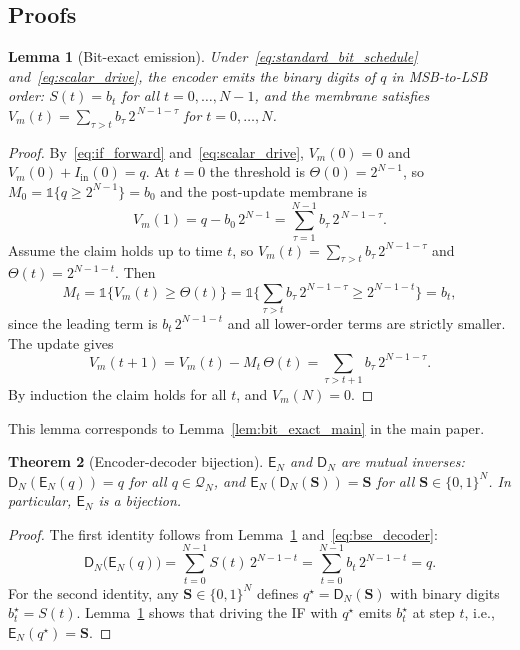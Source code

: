 \documentclass{article}
\theoremstyle{plain}
\newtheorem{theorem}{Theorem}[section]
\newtheorem{lemma}[theorem]{Lemma}
\theoremstyle{definition}
\theoremstyle{remark}
\begin{document}
\subsection{Proofs}
\label{app:bse_proofs}

\begin{lemma}[Bit-exact emission]
\label{lem:bit_exact}
Under~\eqref{eq:standard_bit_schedule} and~\eqref{eq:scalar_drive}, the encoder
emits the binary digits of $q$ in MSB-to-LSB order: $S(t) = b_t$ for all
$t = 0, \dots, N-1$, and the membrane satisfies
$V_m(t) = \sum_{\tau > t} b_\tau\,2^{\,N-1-\tau}$ for $t = 0, \dots, N$.
\end{lemma}

\begin{proof}
By~\eqref{eq:if_forward} and~\eqref{eq:scalar_drive}, $V_m(0) = 0$ and
$V_m(0) + I_{\mathrm{in}}(0) = q$. At $t = 0$ the threshold is
$\Theta(0) = 2^{N-1}$, so $M_0 = \mathbb{1}\{q \ge 2^{N-1}\} = b_0$ and the
post-update membrane is
\[
V_m(1) = q - b_0\,2^{N-1} = \sum_{\tau=1}^{N-1} b_\tau\,2^{\,N-1-\tau}.
\]
Assume the claim holds up to time $t$, so $V_m(t) = \sum_{\tau > t}
b_\tau\,2^{N-1-\tau}$ and $\Theta(t) = 2^{N-1-t}$. Then
\[
M_t
= \mathbb{1}\{V_m(t) \ge \Theta(t)\}
= \mathbb{1}\!\Big\{\sum_{\tau > t} b_\tau\,2^{N-1-\tau} \ge 2^{N-1-t}\Big\}
= b_t,
\]
since the leading term is $b_t\,2^{N-1-t}$ and all lower-order terms are strictly
smaller. The update gives
\[
V_m(t+1) = V_m(t) - M_t\,\Theta(t) = \sum_{\tau > t+1} b_\tau\,2^{N-1-\tau}.
\]
By induction the claim holds for all $t$, and $V_m(N) = 0$.
\end{proof}

This lemma corresponds to Lemma~\ref{lem:bit_exact_main} in the main paper.

\begin{theorem}[Encoder-decoder bijection]
\label{thm:bijective}
$\mathsf{E}_N$ and $\mathsf{D}_N$ are mutual inverses:
$\mathsf{D}_N(\mathsf{E}_N(q)) = q$ for all $q \in \mathcal{Q}_N$, and
$\mathsf{E}_N(\mathsf{D}_N(\mathbf{S})) = \mathbf{S}$ for all
$\mathbf{S} \in \{0,1\}^N$. In particular, $\mathsf{E}_N$ is a bijection.
\end{theorem}

\begin{proof}
The first identity follows from Lemma~\ref{lem:bit_exact} and~\eqref{eq:bse_decoder}:
\[
\mathsf{D}_N\!\big(\mathsf{E}_N(q)\big)
= \sum_{t=0}^{N-1} S(t)\,2^{N-1-t}
= \sum_{t=0}^{N-1} b_t\,2^{N-1-t} = q.
\]
For the second identity, any $\mathbf{S} \in \{0,1\}^N$ defines
$q^\star = \mathsf{D}_N(\mathbf{S})$ with binary digits $b_t^\star = S(t)$.
Lemma~\ref{lem:bit_exact} shows that driving the IF with $q^\star$ emits $b_t^\star$
at step $t$, i.e., $\mathsf{E}_N(q^\star) = \mathbf{S}$.
\end{proof}
\end{document}
